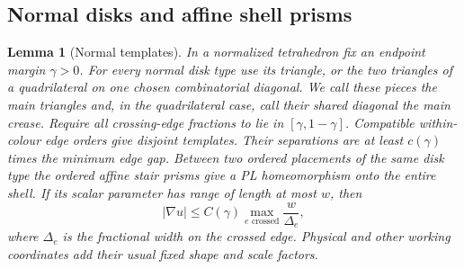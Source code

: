 \documentclass[11pt]{article}
\numberwithin{equation}{section}
\newtheorem{lemma}[theorem]{Lemma}
\theoremstyle{definition}
\theoremstyle{remark}
\begin{document}
\subsection{Normal disks and affine shell prisms}

\begin{lemma}[Normal templates]
\label{ms:normal-templates}
In a normalized tetrahedron fix an endpoint margin $\gamma>0$.
For every normal disk type use its triangle, or the two triangles
of a quadrilateral on one chosen combinatorial diagonal.  We call these
pieces the main triangles and, in the quadrilateral case, call their
shared diagonal the main crease.  Require all crossing-edge fractions
to lie in $[\gamma,1-\gamma]$.
Compatible within-colour edge orders give disjoint templates.
Their separations are at least $c(\gamma)$ times the minimum edge
gap.  Between two ordered placements of the same disk type the
ordered affine stair prisms give a PL homeomorphism onto the entire
shell.  If its scalar parameter has range of length at most $w$,
then
\begin{equation}
 |\nabla u|\le C(\gamma)
       \max_{e\text{ crossed}}\frac{w}{\Delta_e},
 \label{ms:normal-slope}
\end{equation}
where $\Delta_e$ is the fractional width on the crossed edge.
Physical and other working coordinates add their usual fixed shape
and scale factors.
\end{lemma}
\end{document}
